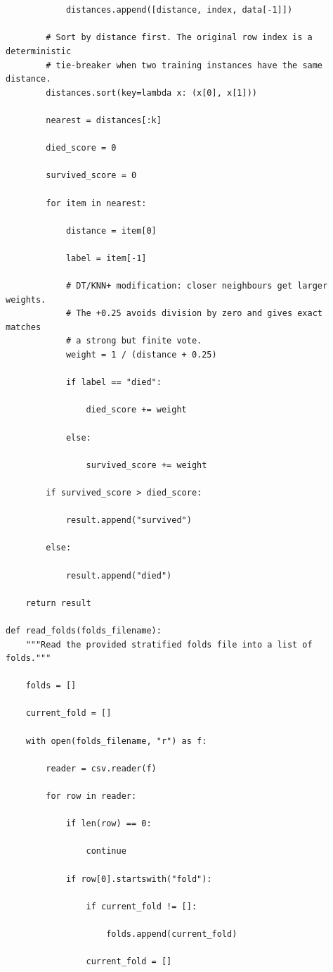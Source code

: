\documentclass[12pt,a4paper]{article}
\begin{document}
{\begin{verbatim}
        

            distances.append([distance, index, data[-1]])

        # Sort by distance first. The original row index is a deterministic
        # tie-breaker when two training instances have the same distance.
        distances.sort(key=lambda x: (x[0], x[1]))

        nearest = distances[:k]

        died_score = 0

        survived_score = 0

        for item in nearest:

            distance = item[0]

            label = item[-1]

            # DT/KNN+ modification: closer neighbours get larger weights.
            # The +0.25 avoids division by zero and gives exact matches
            # a strong but finite vote.
            weight = 1 / (distance + 0.25)

            if label == "died":

                died_score += weight

            else:

                survived_score += weight

        if survived_score > died_score:

            result.append("survived")

        else:

            result.append("died")

    return result

def read_folds(folds_filename):
    """Read the provided stratified folds file into a list of folds."""

    folds = []

    current_fold = []

    with open(folds_filename, "r") as f:

        reader = csv.reader(f)

        for row in reader:

            if len(row) == 0:

                continue

            if row[0].startswith("fold"):

                if current_fold != []:

                    folds.append(current_fold)

                current_fold = []


\end{verbatim}}
\end{document}
